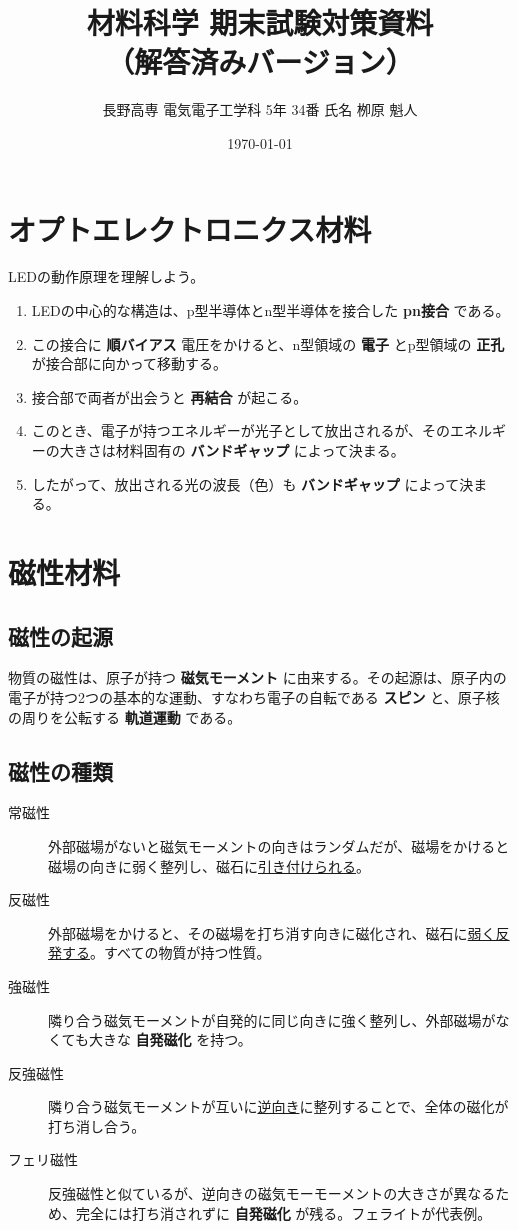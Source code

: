 \documentclass[11pt,a4paper]{ltjsarticle}
\title{材料科学 期末試験対策資料\\
（解答済みバージョン）}
\author{長野高専 電気電子工学科 5年 34番 氏名 栁原 魁人}
\date{\today}
\newcommand{\ans}[1]{\textbf{#1}}
\begin{document}
\maketitle
\thispagestyle{fancy}

\tableofcontents
\clearpage

\section{オプトエレクトロニクス材料}
LEDの動作原理を理解しよう。

\begin{enumerate}
    \item LEDの中心的な構造は、p型半導体とn型半導体を接合した \ans{pn接合} である。
    \item この接合に \ans{順バイアス} 電圧をかけると、n型領域の \ans{電子} とp型領域の \ans{正孔} が接合部に向かって移動する。
    \item 接合部で両者が出会うと \ans{再結合} が起こる。
    \item このとき、電子が持つエネルギーが光子として放出されるが、そのエネルギーの大きさは材料固有の \ans{バンドギャップ} によって決まる。
    \item したがって、放出される光の波長（色）も \ans{バンドギャップ} によって決まる。
\end{enumerate}

\section{磁性材料}

\subsection{磁性の起源}
物質の磁性は、原子が持つ \ans{磁気モーメント} に由来する。その起源は、原子内の電子が持つ2つの基本的な運動、すなわち電子の自転である \ans{スピン} と、原子核の周りを公転する \ans{軌道運動} である。

\subsection{磁性の種類}
\begin{description}
    \item[常磁性] 外部磁場がないと磁気モーメントの向きはランダムだが、磁場をかけると磁場の向きに弱く整列し、磁石に\underline{引き付けられる}。
    \item[反磁性] 外部磁場をかけると、その磁場を打ち消す向きに磁化され、磁石に\underline{弱く反発する}。すべての物質が持つ性質。
    \item[強磁性] 隣り合う磁気モーメントが自発的に同じ向きに強く整列し、外部磁場がなくても大きな \ans{自発磁化} を持つ。
    \item[反強磁性] 隣り合う磁気モーメントが互いに\underline{逆向き}に整列することで、全体の磁化が打ち消し合う。
    \item[フェリ磁性] 反強磁性と似ているが、逆向きの磁気モーモーメントの大きさが異なるため、完全には打ち消されずに \ans{自発磁化} が残る。フェライトが代表例。
\end{description}
\end{document}
